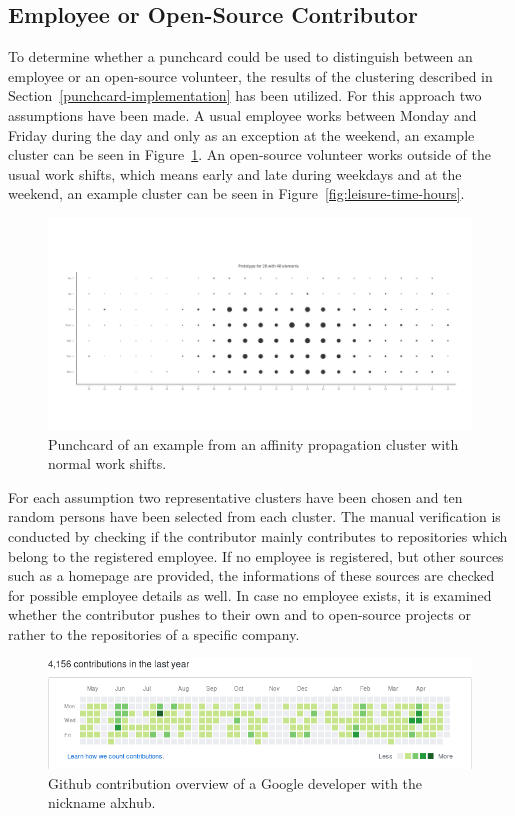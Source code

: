 \subsection{Employee or Open-Source Contributor}
To determine whether a punchcard could be used to distinguish between an employee or an open-source volunteer, the results of the clustering described in Section~\ref{punchcard-implementation} has been utilized.
For this approach two assumptions have been made.
A usual employee works between Monday and Friday during the day and only as an exception at the weekend, an example cluster can be seen in Figure~\ref{fig:normal-office-hours}.
An open-source volunteer works outside of the usual work shifts, which means early and late during weekdays and at the weekend, an example cluster can be seen in Figure~\ref{fig:leisure-time-hours}.

\begin{figure}[H]
    \includegraphics[scale=0.32]{./graphs/analysis-affinity/28}
    \centering
    \caption{Punchcard of an example from an affinity propagation cluster with normal work shifts.}\label{fig:normal-office-hours}
\end{figure}

For each assumption two representative clusters have been chosen and ten random persons have been selected from each cluster.
The manual verification is conducted by checking if the contributor mainly contributes to repositories which belong to the registered employee.
If no employee is registered, but other sources such as a homepage are provided, the informations of these sources are checked for possible employee details as well.
In case no employee exists, it is examined whether the contributor pushes to their own and to open-source projects or rather to the repositories of a specific company.

\begin{figure}[H]
    \includegraphics[scale=0.6]{./graphs/contribution-overview-alxhub}
    \centering
    \caption{Github contribution overview of a Google developer with the nickname alxhub.}\label{fig:github-contribution-overview}
\end{figure}

